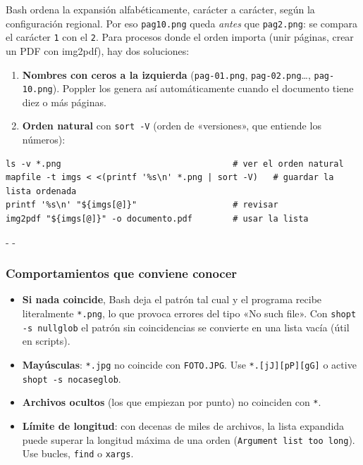 \documentclass[11pt,a4paper]{article}
\makeatletter
\newcommand{\necesitaespacio}[1]{\par\penalty-100\begingroup
	\setlength{\dimen@}{#1}\dimen@ii\pagegoal\advance\dimen@ii-\pagetotal
	\ifdim\dimen@>\dimen@ii\ifdim\dimen@ii>\z@\vfil\fi\penalty-\@M\fi\endgroup}
\newcommand{\cmd}[1]{\texttt{\textcolor{colcmd}{#1}}}      %
\newcommand{\arch}[1]{\texttt{\textcolor{colarch}{#1}}}    %
\makeatother
\begin{document}
	Bash ordena la expansión alfabéticamente, carácter a carácter, según la configuración regional. Por eso \arch{pag10.png} queda \emph{antes} que \arch{pag2.png}: se compara el carácter \texttt{1} con el \texttt{2}. Para procesos donde el orden importa (unir páginas, crear un PDF con img2pdf), hay dos soluciones:
	
	\begin{enumerate}
		\item \textbf{Nombres con ceros a la izquierda} (\arch{pag-01.png}, \arch{pag-02.png}\ldots, \arch{pag-10.png}). Poppler los genera así automáticamente cuando el documento tiene diez o más páginas.
		\item \textbf{Orden natural} con \cmd{sort -V} (orden de «versiones», que entiende los números):
	\end{enumerate}
	
	\begin{lstlisting}
ls -v *.png                                  # ver el orden natural
mapfile -t imgs < <(printf '%s\n' *.png | sort -V)   # guardar la lista ordenada
printf '%s\n' "${imgs[@]}"                   # revisar
img2pdf "${imgs[@]}" -o documento.pdf        # usar la lista
\end{lstlisting}
	
	\necesitaespacio{6\baselineskip}
	\subsubsection{Comportamientos que conviene conocer}
	
	\begin{itemize}
		\item \textbf{Si nada coincide}, Bash deja el patrón tal cual y el programa recibe literalmente \arch{*.png}, lo que provoca errores del tipo «No such file». Con \cmd{shopt -s nullglob} el patrón sin coincidencias se convierte en una lista vacía (útil en scripts).
		\item \textbf{Mayúsculas}: \arch{*.jpg} no coincide con \arch{FOTO.JPG}. Use \arch{*.[jJ][pP][gG]} o active \cmd{shopt -s nocaseglob}.
		\item \textbf{Archivos ocultos} (los que empiezan por punto) no coinciden con \arch{*}.
		\item \textbf{Límite de longitud}: con decenas de miles de archivos, la lista expandida puede superar la longitud máxima de una orden (\texttt{Argument list too long}). Use bucles, \cmd{find} o \cmd{xargs}.
	\end{itemize}
	
\end{document}
